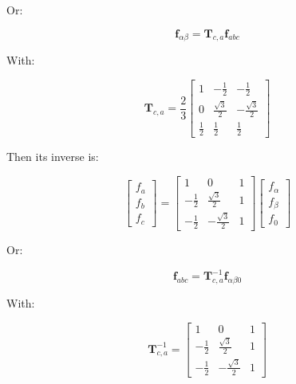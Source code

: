 \documentclass{article}
\begin{document}
Or:

\begin{equation}
    \mathbf{f}_{\alpha\beta}
    =
    \mathbf{T}_{c,a}\mathbf{f}_{abc}
\end{equation}

With:

\begin{equation}
    \mathbf{T}_{c,a}
    =
    \frac{2}{3}
    \begin{bmatrix}
        1 & -\frac{1}{2} & -\frac{1}{2} \\[2mm]
        0 & \frac{\sqrt{3}}{2} & -\frac{\sqrt{3}}{2} \\[2mm]
        \frac{1}{2} & \frac{1}{2} & \frac{1}{2}
    \end{bmatrix}
\end{equation}

Then its inverse is:

\begin{equation}
    \begin{bmatrix}
        f_a \\
        f_b \\
        f_c
    \end{bmatrix}
    =
    \begin{bmatrix}
        1 & 0 & 1 \\[2mm]
        -\frac{1}{2} & \frac{\sqrt{3}}{2} & 1 \\[2mm]
        -\frac{1}{2} & -\frac{\sqrt{3}}{2} & 1
    \end{bmatrix}
    \begin{bmatrix}
        f_{\alpha} \\
        f_{\beta} \\
        f_0
    \end{bmatrix}
\end{equation}

Or:

\begin{equation}
    \mathbf{f}_{abc}
    =
    \mathbf{T}_{c,a}^{-1}\mathbf{f}_{\alpha\beta0}
\end{equation}

With:

\begin{equation}
    \mathbf{T}_{c,a}^{-1}
    =
    \begin{bmatrix}
        1 & 0 & 1 \\[2mm]
        -\frac{1}{2} & \frac{\sqrt{3}}{2} & 1 \\[2mm]
        -\frac{1}{2} & -\frac{\sqrt{3}}{2} & 1
    \end{bmatrix}
\end{equation}
\end{document}

